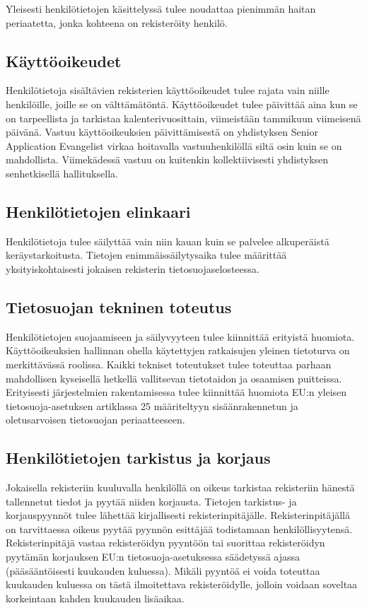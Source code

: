 \documentclass[finnish]{tktltiki}
\begin{document}
Yleisesti henkilötietojen käsittelyssä tulee noudattaa pienimmän haitan periaatetta, jonka kohteena on rekisteröity henkilö.


\subsection*{Käyttöoikeudet}

Henkilötietoja sisältävien rekisterien käyttöoikeudet tulee rajata vain niille henkilöille, joille se on välttämätöntä. Käyttöoikeudet tulee päivittää aina kun se on tarpeellista ja tarkistaa kalenterivuosittain, viimeistään tammikuun viimeisenä päivänä. Vastuu käyttöoikeuksien päivittämisestä on yhdistyksen Senior Application Evangelist virkaa hoitavalla vastuuhenkilöllä siltä osin kuin se on mahdollista. Viimekädessä vastuu on kuitenkin kollektiivisesti yhdistyksen senhetkisellä hallituksella.


\subsection*{Henkilötietojen elinkaari}

Henkilötietoja tulee säilyttää vain niin kauan kuin se palvelee alkuperäistä keräystarkoitusta. Tietojen enimmäissäilytysaika tulee määrittää yksityiskohtaisesti jokaisen rekisterin tietosuojaselosteessa.


\subsection*{Tietosuojan tekninen toteutus}

Henkilötietojen suojaamiseen ja säilyvyyteen tulee kiinnittää erityistä huomiota. Käyttöoikeuksien hallinnan ohella käytettyjen ratkaisujen yleinen tietoturva on merkittävässä roolissa. Kaikki tekniset toteutukset tulee toteuttaa parhaan mahdollisen kyseisellä hetkellä vallitsevan tietotaidon ja osaamisen puitteissa. Erityisesti järjestelmien rakentamisessa tulee kiinnittää huomiota EU:n yleisen tietosuoja-asetuksen artiklassa 25 määriteltyyn sisäänrakennetun ja oletusarvoisen tietosuojan periaatteeseen.


\subsection*{Henkilötietojen tarkistus ja korjaus}

Jokaisella rekisteriin kuuluvalla henkilöllä on oikeus tarkistaa rekisteriin hänestä tallennetut tiedot ja pyytää niiden korjausta. Tietojen tarkistus- ja korjauspyynnöt tulee lähettää kirjallisesti rekisterinpitäjälle. Rekisterinpitäjällä on tarvittaessa oikeus pyytää pyynnön esittäjää todistamaan henkilöllisyytensä. Rekisterinpitäjä vastaa rekisteröidyn pyyntöön tai suorittaa rekisteröidyn pyytämän korjauksen EU:n tietosuoja-asetuksessa säädetyssä ajassa (pääsääntöisesti kuukauden kuluessa). Mikäli pyyntöä ei voida toteuttaa kuukauden kuluessa on tästä ilmoitettava rekisteröidylle, jolloin voidaan soveltaa korkeintaan kahden kuukauden lisäaikaa.
\end{document}
